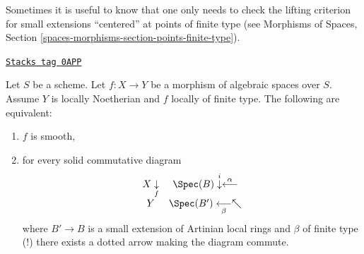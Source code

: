 Sometimes it is useful to know that one only needs to check the
lifting criterion for small extensions ``centered'' at points
of finite type (see
Morphisms of Spaces, Section \ref{spaces-morphisms-section-points-finite-type}).

\begin{lemma}
\label{spaces-more-morphisms-lemma-lifting-along-artinian}
\href{https://stacks.math.columbia.edu/tag/0APP}{\texttt{Stacks tag 0APP}}

Let $S$ be a scheme. Let $f : X \to Y$ be a morphism of algebraic spaces
over $S$. Assume $Y$ is locally Noetherian and $f$ locally of finite type.
The following are equivalent:
\begin{enumerate}
\item $f$ is smooth,
\item for every solid commutative diagram
$$
\begin{array}{cc}X \underset{f}{\downarrow} & \Spec(B) \overset{i}{\downarrow}\overset{\alpha}{\longleftarrow} \\ Y & \Spec(B') \underset{\beta}{\longleftarrow}\nwarrow\end{array}
$$
where $B' \to B$ is a small extension of Artinian local rings
and $\beta$ of finite type (!) there exists a dotted arrow making
the diagram commute.
\end{enumerate}
\end{lemma}

